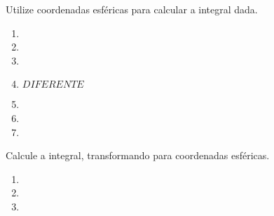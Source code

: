 



	
	
	\vspace{5mm}
	
	Utilize coordenadas esféricas para calcular a integral dada.
	
	\begin{enumerate}
		
		\item 
		\resposta{}
		
		\item 
		\resposta{}
		
		\item 
		\resposta{}
		
		\item $DIFERENTE$
		
		\item 
		\resposta{}
		
		\item 
		\resposta{}
		
		\item 
		\resposta{}

	\end{enumerate}
	
	\vspace{5mm}	
	
	Calcule a integral, transformando para coordenadas esféricas.
	
	\begin{enumerate}[resume]
	
		\item 
		\resposta{}
		
		\item 
		\resposta{}
		
		\item 
		\resposta{}
		
	\end{enumerate}
		
	\vspace{5mm}	
	
	


